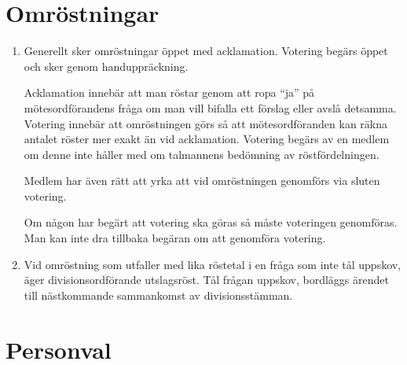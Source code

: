 \documentclass{dvd}
\begin{document}
	\section{Omröstningar}

	\begin{enumerate}[label=\arabic* §, ref=\arabic*]
		\item Generellt sker omröstningar öppet med acklamation.
		Votering begärs öppet och sker genom handuppräckning.

		Acklamation innebär att man röstar genom att ropa ``ja'' på mötesordförandens fråga om man vill bifalla ett förslag eller avslå detsamma.
		Votering innebär att omröstningen görs så att mötesordföranden kan räkna antalet röster mer exakt än vid acklamation.
		Votering begärs av en medlem om denne inte håller med om talmannens bedömning av röstfördelningen.

		Medlem har även rätt att yrka att vid omröstningen genomförs via sluten votering.

		Om någon har begärt att votering ska göras så måste voteringen genomföras.
		Man kan inte dra tillbaka begäran om att genomföra votering.

		\item Vid omröstning som utfaller med lika röstetal i en fråga som inte tål uppskov, äger divisionsordförande utslagsröst.
		Tål frågan uppskov, bordläggs ärendet till nästkommande sammankomst av divisionsstämman.
	\end{enumerate}

	\section{Personval}
\end{document}
